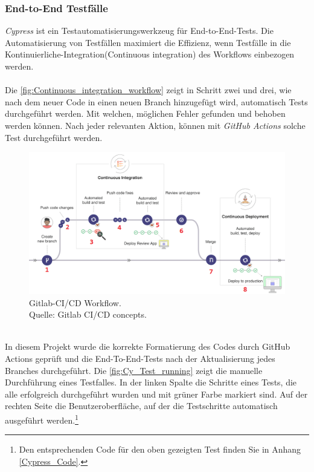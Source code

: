 \subsubsection*{End-to-End Testfälle}
\textit{Cypress} ist ein Testautomatisierungswerkzeug für End-to-End-Tests. 
Die Automatisierung von Testfällen maximiert die Effizienz, wenn Testfälle in die Kontinuierliche-Integration(Continuous integration) des Workflows einbezogen werden. %
\\\\
Die \autoref{fig:Continuous_integration_workflow} zeigt in Schritt zwei und drei, wie nach dem neuer Code in einen neuen Branch hinzugefügt wird, automatisch Tests durchgeführt werden. Mit welchen, möglichen Fehler gefunden und behoben werden können. Nach jeder relevanten Aktion, können mit \textit{GitHub Actions} solche Test durchgeführt werden.
\begin{figure}[h!]
	\centering
    \includegraphics[width=\textwidth]{sources/Gitlab-CI.png}
	\caption{Gitlab-CI/CD Workflow. \\
	Quelle: Gitlab CI/CD concepts{\cite{GLAB1}}.}
	\label{fig:Continuous_integration_workflow} 
\end{figure}
\\
In diesem Projekt wurde die korrekte Formatierung des Codes durch GitHub Actions geprüft und die End-To-End-Tests nach der Aktualisierung jedes Branches durchgeführt.
\newpage
Die \autoref{fig:Cy_Test_running} zeigt die manuelle Durchführung eines Testfalles. In der linken Spalte die Schritte eines Tests, die alle erfolgreich durchgeführt wurden und mit grüner Farbe markiert sind. Auf der rechten Seite die Benutzeroberfläche, auf der die Testschritte automatisch ausgeführt werden.\footnote{Den entsprechenden Code für den oben gezeigten Test finden Sie in Anhang \ref{Cypress_Code}.
}

